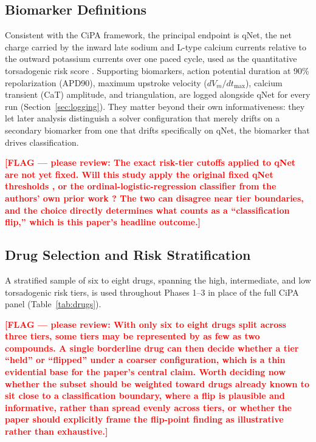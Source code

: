 \documentclass[journal]{IEEEtran}
\newcommand{\flag}[1]{\textcolor{red}{\textbf{[FLAG --- please review: #1]}}}
\begin{document}
\subsection{Biomarker Definitions}
\label{sec:biomarkers}

Consistent with the CiPA framework, the principal endpoint is qNet, the net charge carried by the inward late sodium and L-type calcium currents relative to the outward potassium currents over one paced cycle, used as the quantitative torsadogenic risk score \cite{li2017}. Supporting biomarkers, action potential duration at 90\% repolarization (APD90), maximum upstroke velocity ($dV_m/dt_{\max}$), calcium transient (CaT) amplitude, and triangulation, are logged alongside qNet for every run (Section~\ref{sec:logging}). They matter beyond their own informativeness: they let later analysis distinguish a solver configuration that merely drifts on a secondary biomarker from one that drifts specifically on qNet, the biomarker that drives classification.

\flag{The exact risk-tier cutoffs applied to qNet are not yet fixed. Will this study apply the original fixed qNet thresholds \cite{li2017}, or the ordinal-logistic-regression classifier from the authors' own prior work \cite{kamanditya2024}? The two can disagree near tier boundaries, and the choice directly determines what counts as a ``classification flip,'' which is this paper's headline outcome.}

\subsection{Drug Selection and Risk Stratification}
\label{sec:drugs}

A stratified sample of six to eight drugs, spanning the high, intermediate, and low torsadogenic risk tiers, is used throughout Phases 1--3 in place of the full CiPA panel (Table~\ref{tab:drugs}).

\flag{With only six to eight drugs split across three tiers, some tiers may be represented by as few as two compounds. A single borderline drug can then decide whether a tier ``held'' or ``flipped'' under a coarser configuration, which is a thin evidential base for the paper's central claim. Worth deciding now whether the subset should be weighted toward drugs already known to sit close to a classification boundary, where a flip is plausible and informative, rather than spread evenly across tiers, or whether the paper should explicitly frame the flip-point finding as illustrative rather than exhaustive.}
\end{document}
